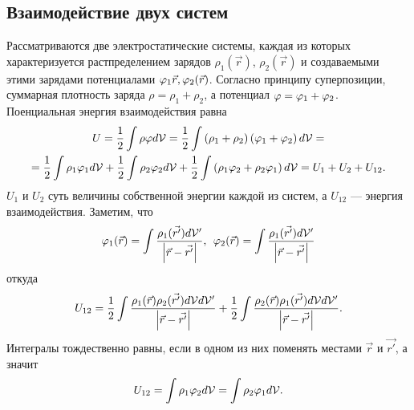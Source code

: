 \subsection{Взаимодействие двух систем}
    Рассматриваются две электростатические системы, каждая из которых характеризуется растпределением зарядов $\rho_1(\vec{r})$, $\rho_2(\vec{r})$
    и создаваемыми этими зарядами потенциалами $\varphi_1{\vec{r}}, \varphi_2(\vec{r})$. Согласно принципу суперпозиции, суммарная плотность заряда
    $\rho = \rho_1 + \rho_2$, а потенциал $\varphi = \varphi_1 + \varphi_2$. Поенциальная энергия взаимодействия равна
    \begin{gather*}
        U = \frac 12 \int\rho\varphi d\mathcal{V} = \frac 12 \int \left({\rho_1 + \rho_2}\right)\left({\varphi_1 + \varphi_2}\right)d\mathcal{V} = \\
        = \frac 12 \int \rho_1 \varphi_1 d\mathcal{V} + \frac 12 \int \rho_2 \varphi_2 d\mathcal{V} + \frac 12 \int \left({\rho_1 \varphi_2 + \rho_2 \varphi_1}\right) d\mathcal{V} =
        U_1 + U_2 + U_{12}.
    \end{gather*}
    $U_1$ и $U_2$ суть величины собственной энергии каждой из систем, а $U_{12}$ --- энергия взаимодействия. Заметим, что
    \[
        \varphi_1(\vec{r}) = \int\frac{\rho_1(\vec{r'})d\mathcal{V}'}{\left|{\vec{r} - \vec{r'}}\right|}, \:\:
        \varphi_2(\vec{r}) = \int\frac{\rho_1(\vec{r'})d\mathcal{V}'}{\left|{\vec{r} - \vec{r'}}\right|}
    \]
    откуда
    \[
        U_{12} = \frac 12 \int\frac{\rho_1(\vec{r})\rho_2({\vec{r'}})d\mathcal{V} d\mathcal{V}'}{\left|{\vec{r} - \vec{r'}}\right|} + 
        \frac 12 \int\frac{\rho_2(\vec{r})\rho_1({\vec{r'}})d\mathcal{V} d\mathcal{V}'}{\left|{\vec{r} - \vec{r'}}\right|}.
    \]
    Интегралы тождественно равны, если в одном из них поменять местами $\vec{r}$ и $\vec{r'}$, а значит
    \[
        U_{12} = \int\rho_1\varphi_2 d\mathcal{V} = \int \rho_2\varphi_1d\mathcal{V}.
    \]

    \begin{figure}[h]
    \end{figure}

